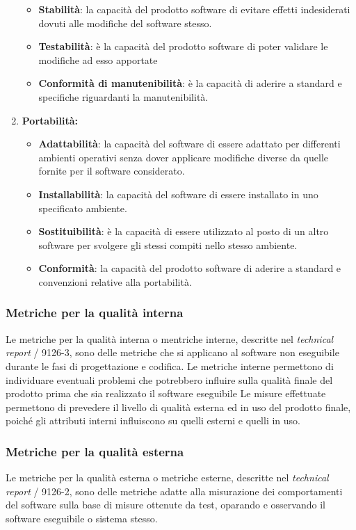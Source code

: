 \begin{enumerate}
\begin{itemize}
      \item \textbf{Stabilità}: la capacità del prodotto software di evitare effetti indesiderati dovuti alle modifiche del software stesso.
      \item \textbf{Testabilità}: è la capacità del prodotto software di poter validare le modifiche ad esso apportate
      \item \textbf{Conformità di manutenibilità}: è la capacità di aderire a standard e specifiche riguardanti la manutenibilità.
    \end{itemize}
    \item \textbf{Portabilità:}
    \begin{itemize}
      \item \textbf{Adattabilità}: la capacità del software di essere adattato per differenti ambienti operativi senza dover applicare modifiche diverse da quelle fornite per il software considerato.
      \item \textbf{Installabilità}: la capacità del software di essere installato in uno specificato ambiente.
      \item \textbf{Sostituibilità}: è la capacità di essere utilizzato al posto di un altro software per svolgere gli stessi compiti nello stesso ambiente.
      \item \textbf{Conformità}: la capacità del prodotto software di aderire a standard e convenzioni relative alla portabilità.
    \end{itemize}
  \end{enumerate}

  \subsubsection{Metriche per la qualità interna}
    Le metriche per la qualità interna o mentriche interne, descritte nel \emph{technical report} / 9126-3,
    sono delle metriche che si applicano al software non eseguibile durante le fasi di progettazione e codifica.
    Le metriche interne permettono di individuare eventuali problemi che potrebbero influire sulla qualità finale del prodotto prima che sia realizzato il software eseguibile
    Le misure effettuate permettono di prevedere il livello di qualità esterna ed in uso del prodotto finale,
    poiché gli attributi interni influiscono su quelli esterni e quelli in uso.

  \subsubsection{Metriche per la qualità esterna}
    Le metriche per la qualità esterna o metriche esterne, descritte nel \emph{technical report} / 9126-2,
    sono delle metriche adatte alla misurazione dei comportamenti del software sulla base di misure ottenute da test, oparando e osservando il software eseguibile o sistema stesso.

